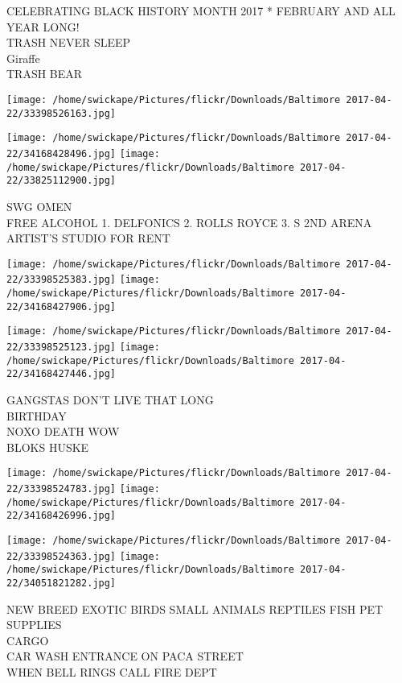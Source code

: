 \documentclass[10pt,letterpaper]{article}
\begin{document}
CELEBRATING BLACK HISTORY MONTH 2017 * FEBRUARY AND ALL YEAR LONG!\\
TRASH NEVER SLEEP\\
Giraffe\\
TRASH BEAR\\
\pagebreak

\texttt{[image: /home/swickape/Pictures/flickr/Downloads/Baltimore 2017-04-22/33398526163.jpg]}

\vspace{0.25in}
\texttt{[image: /home/swickape/Pictures/flickr/Downloads/Baltimore 2017-04-22/34168428496.jpg]}
\texttt{[image: /home/swickape/Pictures/flickr/Downloads/Baltimore 2017-04-22/33825112900.jpg]}

SWG OMEN\\
FREE ALCOHOL 1. DELFONICS 2. ROLLS ROYCE 3. S 2ND ARENA\\
ARTIST'S STUDIO FOR RENT\\
\pagebreak

\texttt{[image: /home/swickape/Pictures/flickr/Downloads/Baltimore 2017-04-22/33398525383.jpg]}
\texttt{[image: /home/swickape/Pictures/flickr/Downloads/Baltimore 2017-04-22/34168427906.jpg]}

\texttt{[image: /home/swickape/Pictures/flickr/Downloads/Baltimore 2017-04-22/33398525123.jpg]}
\texttt{[image: /home/swickape/Pictures/flickr/Downloads/Baltimore 2017-04-22/34168427446.jpg]}

GANGSTAS DON'T LIVE THAT LONG\\
BIRTHDAY\\
NOXO DEATH WOW\\
BLOKS HUSKE\\
\pagebreak

\texttt{[image: /home/swickape/Pictures/flickr/Downloads/Baltimore 2017-04-22/33398524783.jpg]}
\texttt{[image: /home/swickape/Pictures/flickr/Downloads/Baltimore 2017-04-22/34168426996.jpg]}

\texttt{[image: /home/swickape/Pictures/flickr/Downloads/Baltimore 2017-04-22/33398524363.jpg]}
\texttt{[image: /home/swickape/Pictures/flickr/Downloads/Baltimore 2017-04-22/34051821282.jpg]}

NEW BREED EXOTIC BIRDS SMALL ANIMALS REPTILES FISH PET SUPPLIES\\
CARGO\\
CAR WASH ENTRANCE ON PACA STREET\\
WHEN BELL RINGS CALL FIRE DEPT\\
\pagebreak
\end{document}
